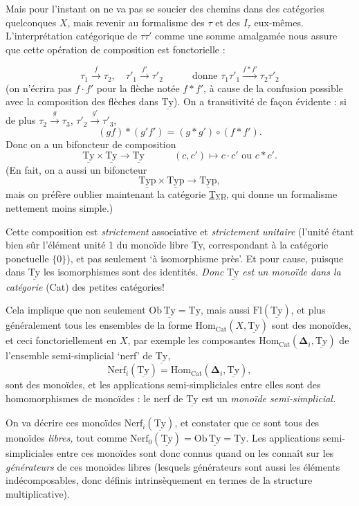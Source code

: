 \documentclass[11pt]{article}
\newcommand{\printedpage}[1]{\marginpar{\footnotesize p.~#1}}
\newcommand{\msp}[1]{\marginpar{\footnotesize [#1]}}
\newcommand{\Ty}{\mathrm{Ty}}
\newcommand{\uTy}{\underline{\mathrm{Ty}}}
\newcommand{\uTyp}{\underline{\mathrm{Typ}}}
\begin{document}
Mais pour l'instant on ne va pas se soucier des chemins dans des catégories quelconques $X$, mais revenir au formalisme des $\tau$ et des $I_\tau$ eux-mêmes. L'interprétation catégorique de $\tau\tau'$ comme une somme amalgamée nous assure que cette opération de composition est fonctorielle :

\msp{page 50}
\[
\tau_1 \xrightarrow{\ f\ } \tau_2, \quad \tau'_1 \xrightarrow{\ f'\ } \tau'_2 \qquad\quad \text{donne } \tau_1\tau'_1 \xrightarrow{f*f'} \tau_2\tau'_2
\]
(on n'écrira pas $f \cdot f'$ pour la flèche notée $f * f'$, à cause de la confusion possible avec la composition des flèches dans $\uTy$). On a transitivité de façon évidente : si de plus $\tau_2 \xrightarrow{\ g\ } \tau_3$, $\tau'_2 \xrightarrow{\ g'\ } \tau'_3$, 
\[
(gf) * (g'f') = (g * g') \circ (f * f').
\]
Donc on a un bifoncteur de composition
\[
\uTy \times \uTy \longrightarrow \uTy \qquad\quad (c,c') \longmapsto c \cdot c' \text{ ou } c * c'.
\]
(En fait, on a aussi un bifoncteur
\[
\uTyp \times \uTyp \longrightarrow \uTyp,
\]
mais on préfère oublier maintenant la catégorie \underline{Typ}, qui donne un formalisme nettement moins simple.)

Cette composition est \textit{strictement} associative et \textit{strictement unitaire} (l'unité étant bien sûr l'élément unité 1 du monoïde libre Ty, correspondant à la catégorie ponctuelle $\{0\}$), et pas seulement `à isomorphisme près'. Et pour cause, puisque dans $\uTy$ les isomorphismes sont des identités. \textit{Donc} $\uTy$ \textit{est un monoïde dans la catégorie} (Cat) des petites catégories!

\msp{page 49$'$: second page so numbered}Cela implique que non seulement $\mathrm{Ob}\,\uTy = \Ty$, mais aussi $\mathrm{Fl}(\uTy)$, et plus généralement tous les ensembles de la forme $\mathrm{Hom}_{\mathrm{Cat}}(X, \uTy)$ sont des monoïdes, et ceci fonctoriellement en $X$, par exemple les composantes $\mathrm{Hom}_{\mathrm{Cat}}(\boldsymbol{\Delta}_i, \uTy)$ de l'ensemble semi-simplicial `nerf' de $\uTy$,
\[
\mathrm{Nerf}_i(\uTy) = \mathrm{Hom}_{\mathrm{Cat}}(\boldsymbol{\Delta}_i, \uTy),
\]
sont des monoïdes, et les applications semi-simpliciales entre elles sont des homomorphismes de monoïdes : le nerf de $\uTy$ est un \textit{monoïde semi-simplicial.}

\printedpage{34}
On va décrire ces monoïdes $\mathrm{Nerf}_i(\uTy)$, et constater que ce sont tous des monoïdes \textit{libres,} tout comme $\mathrm{Nerf}_0(\uTy) = \mathrm{Ob}\,\uTy = \mathrm{Ty}$. Les applications semi-simpliciales entre ces monoïdes sont donc connus quand on les connaît sur les \textit{générateurs} de ces monoïdes libres (lesquels générateurs sont aussi les éléments indécomposables, donc définis intrinsèquement en termes de la structure multiplicative). %
\end{document}
